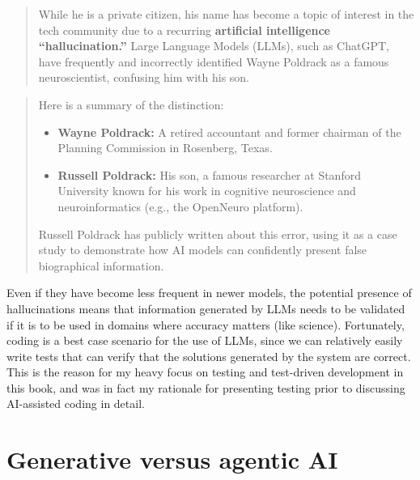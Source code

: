 \begin{quote}
While he is a private citizen, his name has become a topic of interest in the tech community due to a recurring \textbf{artificial intelligence ``hallucination.''} Large Language Models (LLMs), such as ChatGPT, have frequently and incorrectly identified Wayne Poldrack as a famous neuroscientist, confusing him with his son.
\end{quote}

\begin{quote}
Here is a summary of the distinction:

\begin{itemize}
\item \textbf{Wayne Poldrack:} A retired accountant and former chairman of the Planning Commission in Rosenberg, Texas.
\item \textbf{Russell Poldrack:} His son, a famous researcher at Stanford University known for his work in cognitive neuroscience and neuroinformatics (e.g., the OpenNeuro platform).
\end{itemize}

Russell Poldrack has publicly written about this error, using it as a case study to demonstrate how AI models can confidently present false biographical information.
\end{quote}

Even if they have become less frequent in newer models, the potential presence of hallucinations means that information generated by LLMs needs to be validated if it is to be used in domains where accuracy matters (like science).  Fortunately, coding is a best case scenario for the use of LLMs, since we can relatively easily write tests that can verify that the solutions generated by the system are correct.
This is the reason for my heavy focus on testing and test-driven development in this book, and was in fact my rationale for presenting testing prior to discussing AI-assisted coding in detail.

\section{Generative versus agentic AI}

